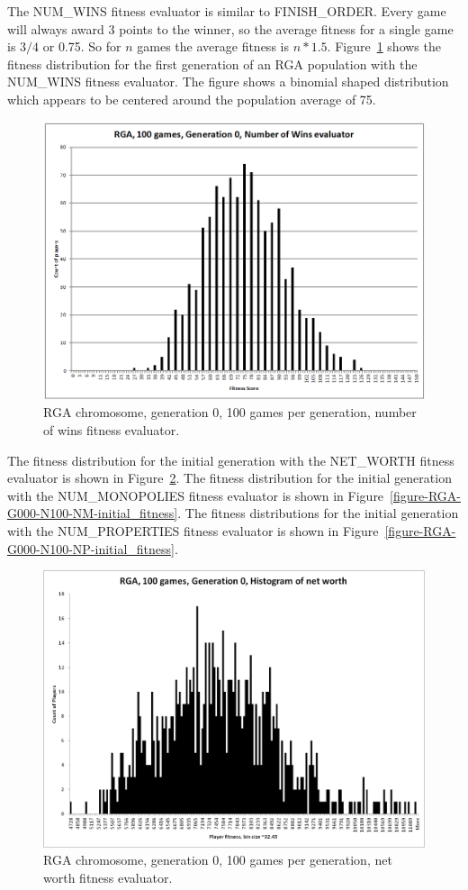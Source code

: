 The NUM\_WINS fitness evaluator is similar to FINISH\_ORDER. Every game will
always award 3 points to the winner, so the average fitness for a single game is
\(3/4\) or 0.75. So for \(n\) games the average fitness is \(n * 1.5\).
Figure~\ref{figure-RGA-G000-N100-NW-initial_fitness} shows the fitness
distribution for the first generation of an RGA population with the
NUM\_WINS fitness evaluator. The figure shows a binomial shaped distribution
which appears to be centered around the population average of 75.

\begin{figure}[htbp]
\centerline{\includegraphics[width=0.75\columnwidth]{Figures/RGA_1024_G000_N100_NW.png}}
\caption[RGA Fitness Distribution, Initial Generation]{RGA chromosome,
generation 0, 100 games per generation, number of wins fitness evaluator.}
\label{figure-RGA-G000-N100-NW-initial_fitness}
\end{figure}

The fitness distribution for the initial generation with the NET\_WORTH fitness
evaluator is shown in Figure~\ref{figure-RGA-G000-N100-NetW-initial_fitness}.
The fitness distribution for the initial generation with the NUM\_MONOPOLIES
fitness evaluator is shown in
Figure~\ref{figure-RGA-G000-N100-NM-initial_fitness}.
The fitness distributions for the initial generation with the NUM\_PROPERTIES
fitness evaluator is shown in
Figure~\ref{figure-RGA-G000-N100-NP-initial_fitness}.

\begin{figure}[htbp]
\centerline{\includegraphics[width=0.75\columnwidth]{Figures/RGA_1024_G000_N100_NetW.png}}
\caption[RGA Fitness Distribution, Initial Generation]{RGA chromosome,
generation 0, 100 games per generation, net worth fitness evaluator.}
\label{figure-RGA-G000-N100-NetW-initial_fitness}
\end{figure}

